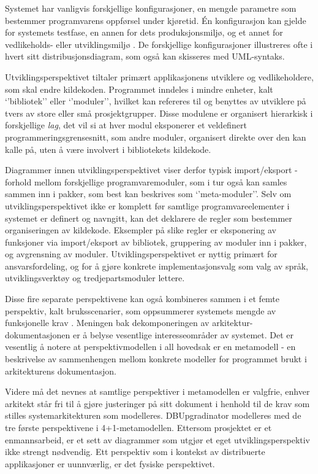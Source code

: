 Systemet har vanligvis forskjellige konfigurasjoner, en mengde parametre som bestemmer programvarens oppførsel under kjøretid. Én konfigurasjon kan gjelde for systemets testfase, en annen for dets produksjonsmiljø, og et annet for vedlikeholds- eller utviklingsmiljø \citep{kruchten1995}. De forskjellige konfigurasjoner illustreres ofte i hvert sitt distribusjonsdiagram, som også kan skisseres med UML-syntaks.

Utviklingsperspektivet tiltaler primært applikasjonens utviklere og vedlikeholdere, som skal endre kildekoden. Programmet inndeles i mindre enheter, kalt ‘’bibliotek’’ eller ‘’moduler’’, hvilket kan refereres til og benyttes av utviklere på tvers av store eller små prosjektgrupper. Disse modulene er organisert hierarkisk i forskjellige \emph{lag}, det vil si at hver modul eksponerer et veldefinert programmeringsgrensesnitt, som andre moduler, organisert direkte over den kan kalle på, uten å være involvert i bibliotekets kildekode.

Diagrammer innen utviklingsperspektivet viser derfor typisk import/eksport - forhold mellom forskjellige programvaremoduler, som i tur også kan samles sammen inn i pakker, som best kan beskrives som ‘’meta-moduler’’. Selv om utviklingsperspektivet ikke er komplett før samtlige programvareelementer i systemet er definert og navngitt, kan det deklarere de regler som bestemmer organiseringen av kildekode. Eksempler på slike regler er eksponering av funksjoner via import/eksport av bibliotek, gruppering av moduler inn i pakker, og avgrensning av moduler. Utviklingsperspektivet er nyttig primært for ansvarsfordeling, og for å gjøre konkrete implementasjonsvalg som valg av språk, utviklingsverktøy og tredjepartsmoduler lettere.

Disse fire separate perspektivene kan også kombineres sammen i et femte perspektiv, kalt bruksscenarier, som oppsummerer systemets mengde av funksjonelle krav \citep{kruchten1995}. Meningen bak dekomponeringen av arkitektur-dokumentasjonen er å belyse vesentlige interesseområder av systemet. Det er vesentlig å notere at perspektivmodellen i all hovedsak er en metamodell - en beskrivelse av sammenhengen mellom konkrete modeller for programmet brukt i arkitekturens dokumentasjon.

Videre må det nevnes at samtlige perspektiver i metamodellen er valgfrie, enhver arkitekt står fri til å gjøre justeringer på sitt dokument i henhold til de krav som stilles systemarkitekturen som modelleres. DBUpgradinator modelleres med de tre første perspektivene i 4+1-metamodellen. Ettersom prosjektet er et enmannsarbeid, er et sett av diagrammer som utgjør et eget utviklingsperspektiv ikke strengt nødvendig. Ett perspektiv som i kontekst av distribuerte applikasjoner er uunnværlig, er det fysiske perspektivet.

